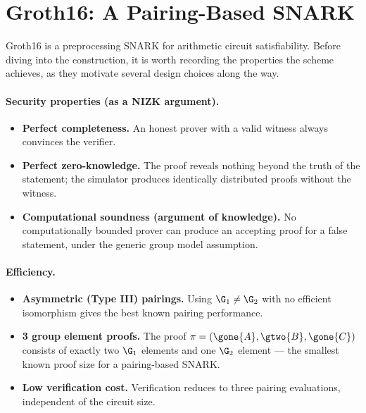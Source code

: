 
\section{Groth16: A Pairing-Based SNARK}

Groth16 is a preprocessing SNARK for arithmetic circuit satisfiability. Before diving into the construction, it is worth recording the properties the scheme achieves, as they motivate several design choices along the way.

\paragraph{Security properties (as a NIZK argument).}
\begin{itemize}
  \item \textbf{Perfect completeness.} An honest prover with a valid witness always convinces the verifier.
  \item \textbf{Perfect zero-knowledge.} The proof reveals nothing beyond the truth of the statement; the simulator produces identically distributed proofs without the witness.
  \item \textbf{Computational soundness (argument of knowledge).} No computationally bounded prover can produce an accepting proof for a false statement, under the generic group model assumption.
\end{itemize}

\paragraph{Efficiency.}
\begin{itemize}
  \item \textbf{Asymmetric (Type III) pairings.} Using $\G_1 \neq \G_2$ with no efficient isomorphism gives the best known pairing performance.
  \item \textbf{3 group element proofs.} The proof $\pi = (\gone{A}, \gtwo{B}, \gone{C})$ consists of exactly two $\G_1$ elements and one $\G_2$ element --- the smallest known proof size for a pairing-based SNARK.
  \item \textbf{Low verification cost.} Verification reduces to three pairing evaluations, independent of the circuit size.
\end{itemize}

